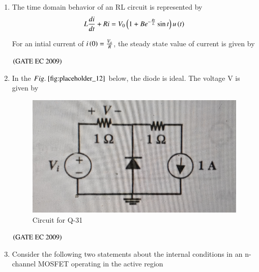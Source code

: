 \documentclass[journal,12pt,onecolumn]{IEEEtran}
\theoremstyle{remark}
\begin{document}
\begin{enumerate}[start=1, label={Q\arabic*.}]
\item The time domain behavior of an RL circuit is represented by 
\begin{align*} 
 L\frac{di}{dt} + Ri = V_0 \left(1+ Be^{-\frac{Rt}{L}} \sin t \right) u\left(t\right)
\end{align*}

For an intial current of $i\left(0\right) = \frac{V_o}{R}$, the steady state value of current is given by 

\begin{enumerate}
\end{enumerate}
\hfill $\left(\text{GATE EC 2009}\right)$

\item In the $\figref{fig:placeholder_12}$ below, the diode is ideal. The voltage V is given by
\begin{figure}[H]
    \centering
    \includegraphics[width=0.5\columnwidth]{figs/img_12.jpg}
    \caption{Circuit for Q-31}
    \label{fig:placeholder_12}
\end{figure}
\begin{enumerate}
\end{enumerate}
\hfill $\left(\text{GATE EC 2009}\right)$

\item Consider the following two statements about the internal conditions in an n-channel MOSFET operating in the active region 
\begin{align*}
    

\end{align*}
\end{enumerate}
\end{document}
